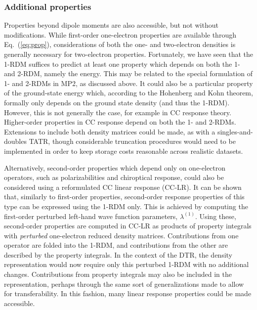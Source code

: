 \subsubsection{Additional properties}
Properties beyond dipole moments are also accessible, but not without modifications. While first-order one-electron properties are available through Eq.~(\ref{eq:prop}), considerations of both the one- and two-electron densities is generally necessary for two-electron properties. 
Fortunately, we have seen that the 1-RDM suffices to predict at least one property which depends on both the 1- and 2-RDM, namely the energy. This may be related to the special formulation of 1- and 2-RDMs in MP2, as discussed above. It could also be a particular property of the ground-state energy which, according to the Hohenberg and Kohn theorem\cite{Hohenberg1964}, formally only depends on the ground state density (and thus the 1-RDM).
However, this is not generally the case, for example in CC response theory. Higher-order properties in CC response depend on both the 1- and 2-RDMs.
Extensions to include both density matrices could be made, as with a singles-and-doubles TATR, though considerable truncation procedures would need to be implemented in order to keep storage costs reasonable across realistic datasets. 

Alternatively, second-order properties which depend only on one-electron operators, such as polarizabilities and chiroptical response, could also be considered using a reformulated CC linear response (CC-LR).  
It can be shown that, similarly to first-order properties, second-order response properties of this type can be expressed using the 1-RDM only. This is achieved by computing the first-order perturbed left-hand wave function parameters, $\lambda^{(1)}$.
Using these, second-order properties are computed in CC-LR as 
products of property integrals with \textit{perturbed} one-electron reduced density matrices\cite{Crawford2019}. 
Contributions from one operator are folded into the 1-RDM, and contributions from the other are described by the property integrals. In the context of the DTR, the density representation would now require only this perturbed 1-RDM with no additional changes. Contributions from property integrals may also be included in the representation, perhaps through the same sort of generalizations made to allow for transferability. In this fashion, many linear response properties could be made accessible. 

